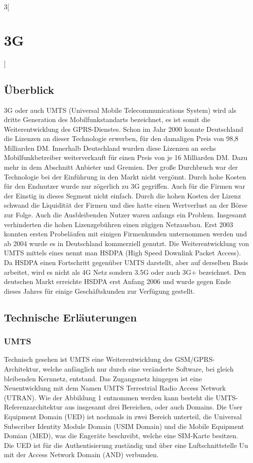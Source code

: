 \begin{multicols}{3}[\section{3G}]
\subsection*{Überblick}
3G oder auch UMTS (Universal Mobile Telecommunications System) wird als dritte Generation des Mobilfunkstandarts bezeichnet, es ist somit die Weiterentwicklung des GPRS-Dienstes. Schon im Jahr 2000 konnte Deutschland die Lizenzen an dieser Technologie erwerben, für den damaligen Preis von 98,8 Milliarden DM. Innerhalb Deutschland wurden diese Lizenzen an sechs Mobilfunkbetreiber weiterverkauft für einen Preis von je 16 Milliarden DM. Dazu mehr in dem Abschnitt Anbieter und Gremien. Der große Durchbruch war der Technologie bei der Einführung in den Markt nicht vergönnt. Durch hohe Kosten für den Endnutzer wurde nur zögerlich zu 3G gegriffen. Auch für die Firmen war der Einstig in dieses Segment nicht einfach. Durch die hohen Kosten der Lizenz schwand die Liquidität der Firmen und dies hatte einen Wertverlust an der Börse zur Folge. Auch die Ausbleibenden Nutzer waren anfangs ein Problem. Insgesamt verhinderten die hohen Lizenzgebühren einen zügigen Netzausbau. Erst 2003 konnten ersten Probeläufen mit einigen Firmenkunden unternommen werden und ab 2004 wurde es in Deutschland kommerziell genutzt.  
Die Weiterentwicklung von UMTS mittels eines nennt man HSDPA (High Speed Downlink Packet Access). Da HSDPA einen Fortschritt gegenüber UMTS darstellt, aber auf derselben Basis arbeitet, wird es nicht als 4G Netz sondern 3.5G oder auch 3G+ bezeichnet. Den deutschen Markt erreichte HSDPA erst Anfang 2006 und wurde gegen Ende dieses Jahres für einige Geschäftskunden zur Verfügung gestellt. ~\cite{3G.1, 3G.2}


\subsection*{Technische Erläuterungen}
\subsubsection*{UMTS}
Technisch gesehen ist UMTS eine Weiterentwicklung des GSM/GPRS- Architektur, welche anfänglich nur durch eine veränderte Software, bei gleich bleibenden Kernnetz, entstand. Das Zugangsnetz hingegen ist eine Neuentwicklung mit dem Namen UMTS Terrestrial Radio Access Network (UTRAN). Wie der Abbildung 1 entnommen werden kann besteht die UMTS-Referenzarchitektur aus insgesamt drei Bereichen, oder auch Domains. 
Die User Equipment Domain (UED) ist nochmals in zwei Bereich unterteil, die Universal Subscriber Identity Module Domain (USIM Domain) und die Mobile Equipment Domian (MED), was die Engeräte beschreibt, welche eine SIM-Karte besitzen. Die UED ist für die Authentisierung zuständig und über eine Luftschnittstelle Uu mit der Access Network Domain (AND) verbunden. 


\end{multicols}
